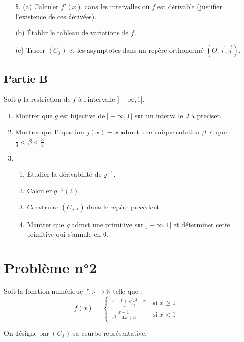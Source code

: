 \documentclass[12pt]{article}
\begin{document}
\begin{enumerate}
    \item[5.] (a) Calculer \( f'(x) \) dans les intervalles où \( f \) est dérivable (justifier l’existence de ces dérivées).
    \item[(b)] Établir le tableau de variations de \( f \).
    \item[(c)] Tracer \( (C_f) \) et les asymptotes dans un repère orthonormé \( (O; \vec{i}, \vec{j}) \).
\end{enumerate}
\subsection*{Partie B}

Soit \( g \) la restriction de \( f \) à l’intervalle \( ] -\infty, 1] \).

\begin{enumerate}
    \item Montrer que \( g \) est bijective de \( ] -\infty, 1] \) sur un intervalle \( J \) à préciser.
    \item Montrer que l’équation \( g(x) = x \) admet une unique solution \( \beta \) et que \( \frac{1}{3} < \beta < \frac{3}{4} \).
    \item 
    \begin{enumerate}
        \item Étudier la dérivabilité de \( g^{-1} \).
        \item Calculer \( g^{-1}(2) \).
        \item Construire \( (C_{g^{-1}}) \) dans le repère précédent.
        \item Montrer que \( g \) admet une primitive sur \( ] -\infty, 1] \) et déterminer cette primitive qui s’annule en 0.
    \end{enumerate}
\end{enumerate}
\section*{Problème n°2}

Soit la fonction numérique \( f : \mathbb{R} \to \mathbb{R} \) telle que :
\[
f(x) = 
\begin{cases} 
\frac{x - 1 + \sqrt{x^2 - x}}{x - 2} & \text{si } x \geq 1 \\
\frac{x - 1}{x^2 - 4x + 3} & \text{si } x < 1 
\end{cases}
\]

On désigne par \( (C_f) \) sa courbe représentative.
\end{document}

